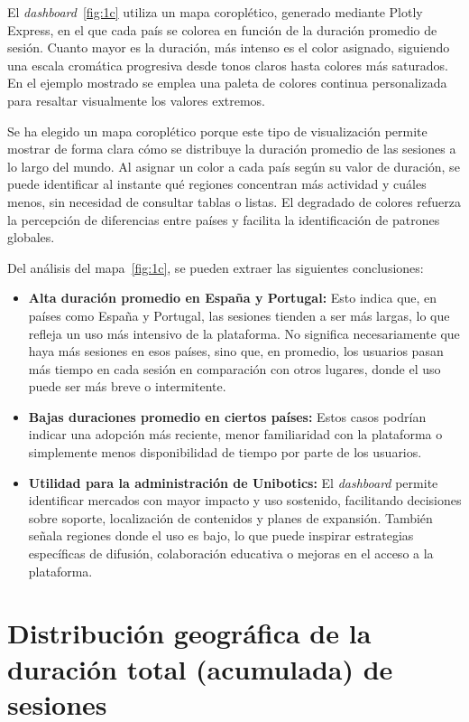 \documentclass[a4paper, 12pt]{book}
\begin{document}
El \textit{dashboard}~\ref{fig:1c} utiliza un mapa coroplético, generado mediante Plotly Express, en el que cada país se colorea en función de la duración promedio de sesión. Cuanto mayor es la duración, más intenso es el color asignado, siguiendo una escala cromática progresiva desde tonos claros hasta colores más saturados. En el ejemplo mostrado se emplea una paleta de colores continua personalizada para resaltar visualmente los valores extremos.


Se ha elegido un mapa coroplético porque este tipo de visualización permite mostrar de forma clara cómo se distribuye la duración promedio de las sesiones a lo largo del mundo. Al asignar un color a cada país según su valor de duración, se puede identificar al instante qué regiones concentran más actividad y cuáles menos, sin necesidad de consultar tablas o listas. El degradado de colores refuerza la percepción de diferencias entre países y facilita la identificación de patrones globales.

Del análisis del mapa~\ref{fig:1c}, se pueden extraer las siguientes conclusiones:

\begin{itemize}
  \item \textbf{Alta duración promedio en España y Portugal:} Esto indica que, en países como España y Portugal, las sesiones tienden a ser más largas, lo que refleja un uso más intensivo de la plataforma. No significa necesariamente que haya más sesiones en esos países, sino que, en promedio, los usuarios pasan más tiempo en cada sesión en comparación con otros lugares, donde el uso puede ser más breve o intermitente.

  \item \textbf{Bajas duraciones promedio en ciertos países:} Estos casos podrían indicar una adopción más reciente, menor familiaridad con la plataforma o simplemente menos disponibilidad de tiempo por parte de los usuarios.

  \item \textbf{Utilidad para la administración de Unibotics:} El \textit{dashboard} permite identificar mercados con mayor impacto y uso sostenido, facilitando decisiones sobre soporte, localización de contenidos y planes de expansión. También señala regiones donde el uso es bajo, lo que puede inspirar estrategias específicas de difusión, colaboración educativa o mejoras en el acceso a la plataforma.
\end{itemize}

\section{Distribución geográfica de la duración total (acumulada) de sesiones}
\label{sec:dash2a}
\end{document}
